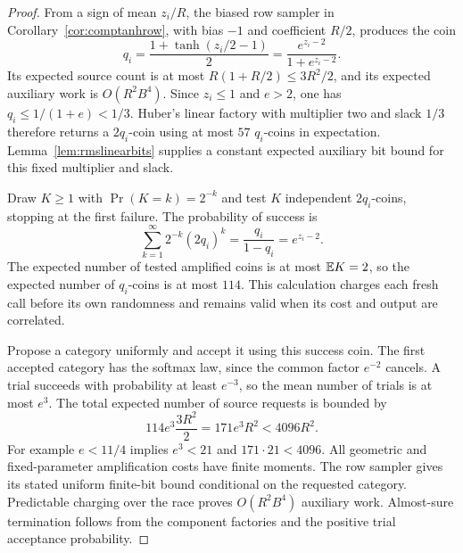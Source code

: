 \begin{proof}
From a sign of mean $z_i/R$, the biased row sampler in
Corollary~\ref{cor:comptanhrow}, with bias $-1$ and coefficient
$R/2$, produces the coin
\[
 q_i=\frac{1+\tanh(z_i/2-1)}2
     =\frac{e^{z_i-2}}{1+e^{z_i-2}}.
\]
Its expected source count is at most
$R(1+R/2)\le3R^2/2$, and its expected auxiliary work is $O(R^2B^4)$.
Since $z_i\le1$ and $e>2$, one has $q_i\le1/(1+e)<1/3$.
Huber's linear factory with multiplier two and slack $1/3$ therefore
returns a $2q_i$-coin using at most $57$ $q_i$-coins in expectation.
Lemma~\ref{lem:rmslinearbits} supplies a constant expected auxiliary
bit bound for this fixed multiplier and slack.

Draw $K\ge1$ with $\Pr(K=k)=2^{-k}$ and test $K$ independent
$2q_i$-coins, stopping at the first failure. The probability of
success is
\[
 \sum_{k=1}^{\infty}2^{-k}(2q_i)^k
 =\frac{q_i}{1-q_i}=e^{z_i-2}.
\]
The expected number of tested amplified coins is at most
$\mathbb E K=2$, so the expected number of $q_i$-coins is at most $114$.
This calculation charges each fresh call before its own randomness
and remains valid when its cost and output are correlated.

Propose a category uniformly and accept it using this success coin.
The first accepted category has the softmax law, since the common
factor $e^{-2}$ cancels. A trial succeeds with probability at least
$e^{-3}$, so the mean number of trials is at most $e^3$.
The total expected number of source requests is bounded by
\[
 114e^3\frac{3R^2}{2}=171e^3R^2<4096R^2.
\]
For example $e<11/4$ implies $e^3<21$ and $171\cdot21<4096$.
All geometric and fixed-parameter amplification costs have finite
moments. The row sampler gives its stated uniform finite-bit bound
conditional on the requested category. Predictable charging over
the race proves $O(R^2B^4)$ auxiliary work. Almost-sure termination
follows from the component factories and the positive trial
acceptance probability.
\end{proof}

